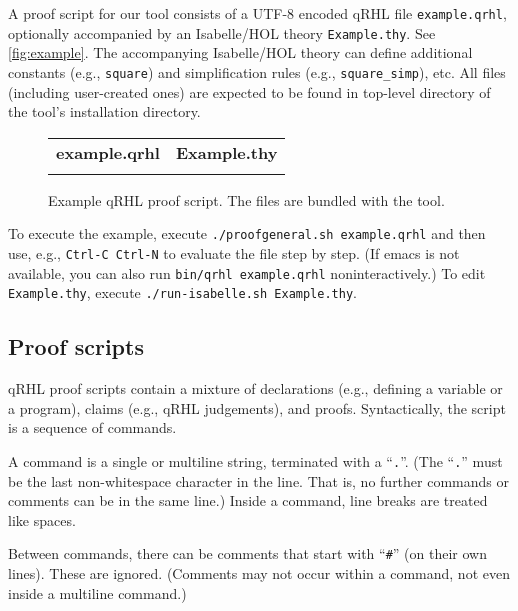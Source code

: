 \documentclass{article}
\begin{document}
A proof script for our tool consists of a UTF-8 encoded qRHL file
\texttt{example.qrhl}, optionally accompanied by an Isabelle/HOL
theory \texttt{Example.thy}. See \autoref{fig:example}. The
accompanying Isabelle/HOL theory can define additional constants
(e.g., \texttt{square}) and simplification rules (e.g.,
\texttt{square\_simp}), etc.  All files (including user-created ones)
are expected to be found in top-level directory of the tool's installation directory.

\begin{figure}[t]\centering
  \lstset{aboveskip=0pt,belowskip=0pt,frame=single}
  \centering
  \begin{tabular}{p{.45\hsize}p{.45\hsize}}
    \textbf{example.qrhl}
    &
      \textbf{Example.thy}
    \\[-5pt]
    
    &
      
  \end{tabular}
  \vspace*{-5mm}
  \caption{Example qRHL proof script. The files are bundled with the tool.}
  \label{fig:example}
\end{figure}

To execute the example, execute \texttt{./proofgeneral.sh
  example.qrhl} and then use, e.g., \texttt{Ctrl-C Ctrl-N} to evaluate
the file step by step. (If emacs is not available, you can also run
\texttt{bin/qrhl example.qrhl} noninteractively.) To edit
\texttt{Example.thy}, execute \texttt{./run-isabelle.sh Example.thy}.

\subsection{Proof scripts}
\label{sec:tool.proofscripts}

qRHL proof scripts contain a mixture of declarations (e.g., defining a
variable or a program), claims (e.g., qRHL judgements), and proofs.
Syntactically, the script is a sequence of commands.

A command is a single or multiline string, terminated with a
``\texttt{.}''. (The ``\texttt{.}'' must be the last non-whitespace character in the
line. That is, no further commands or comments can be in the same
line.) Inside a command, line breaks are treated like spaces.

Between commands, there can be comments that start with ``\texttt{\#}'' (on
their own lines). These are ignored. (Comments may not occur within a
command, not even inside a multiline command.)
\end{document}
